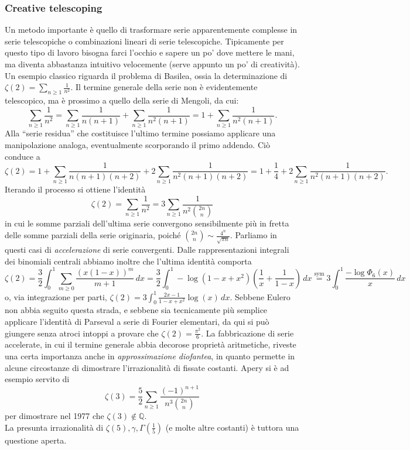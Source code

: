\documentclass[a4paper,twoside]{article}
\newcommand{\Q}{\mathbb{Q}}
\theoremstyle{definition}
\numberwithin{theorem}{section}
\begin{document}
\subsubsection{Creative telescoping}
Un metodo importante è quello di trasformare serie apparentemente complesse in serie telescopiche o combinazioni lineari di serie telescopiche.
Tipicamente per questo tipo di lavoro bisogna farci l'occhio e sapere un po' dove mettere le mani, ma diventa abbastanza intuitivo velocemente (serve appunto un po' di creatività). Un esempio classico riguarda il problema di Basilea, ossia la determinazione di $\zeta(2)=\sum_{n\geq 1}\frac{1}{n^2}$. Il termine generale della serie non è evidentemente telescopico, ma è prossimo a quello della serie di Mengoli, da cui:
$$ \sum_{n\geq 1}\frac{1}{n^2} = \sum_{n\geq 1}\frac{1}{n(n+1)}+\sum_{n\geq 1}\frac{1}{n^2(n+1)} = 1+\sum_{n\geq 1}\frac{1}{n^2(n+1)}. $$
Alla ``serie residua'' che costituisce l'ultimo termine possiamo applicare una manipolazione analoga, eventualmente scorporando il primo addendo. Ciò conduce a 
$$ \zeta(2) = 1+\sum_{n\geq 1}\frac{1}{n(n+1)(n+2)}+2\sum_{n\geq 1}\frac{1}{n^2(n+1)(n+2)} = 1+\frac{1}{4}+2\sum_{n\geq 1}\frac{1}{n^2(n+1)(n+2)}. $$
Iterando il processo si ottiene l'identità 
$$ \zeta(2)=\sum_{n\geq 1}\frac{1}{n^2} = 3\sum_{n\geq 1}\frac{1}{n^2\binom{2n}{n}}$$
in cui le somme parziali dell'ultima serie convergono sensibilmente più in fretta delle somme parziali della serie originaria, poiché $\binom{2n}{n}\sim \frac{4^n}{\sqrt{\pi n}}$. Parliamo in questi casi di \emph{accelerazione} di serie convergenti. Dalle rappresentazioni integrali dei binomiali centrali abbiamo inoltre che l'ultima identità comporta
$$ \zeta(2) = \frac{3}{2}\int_{0}^{1}\sum_{m\geq 0}\frac{(x(1-x))^{m}}{m+1}\,dx = \frac{3}{2}\int_{0}^{1}-\log(1-x+x^2)\left(\frac{1}{x}+\frac{1}{1-x}\right)\,dx \stackrel{\text{sym}}{=}3\int_{0}^{1}\frac{-\log\Phi_6(x)}{x}\,dx $$
o, via integrazione per parti, $\zeta(2)=3\int_{0}^{1}\frac{2x-1}{1-x+x^2}\log(x)\,dx$. Sebbene Eulero non abbia seguito questa strada, e sebbene sia tecnicamente più semplice applicare l'identità di Parseval a serie di Fourier elementari, da qui si può giungere senza atroci intoppi a provare che $\zeta(2)=\frac{\pi^2}{6}$. La fabbricazione di serie accelerate, in cui il termine generale abbia decorose proprietà aritmetiche, riveste una certa importanza anche in \emph{approssimazione diofantea}, in quanto permette in alcune circostanze di dimostrare l'irrazionalità di fissate costanti. Apery si è ad esempio servito di 
$$ \zeta(3) = \frac{5}{2}\sum_{n\geq 1}\frac{(-1)^{n+1}}{n^3\binom{2n}{n}} $$
per dimostrare nel 1977 che $\zeta(3)\not\in\Q$.\\ La presunta irrazionalità di $\zeta(5),\gamma,\Gamma\left(\frac{1}{5}\right)$ (e molte altre costanti) è tuttora una questione aperta.
\end{document}

